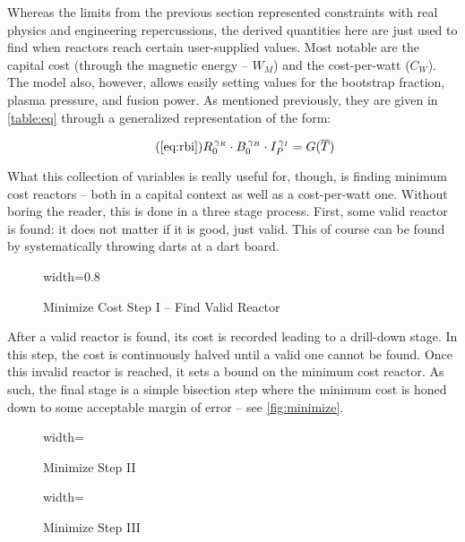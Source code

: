 Whereas the limits from the previous section represented constraints with real physics and engineering repercussions, the derived quantities here are just used to find when reactors reach certain user-supplied values. Most notable are the capital cost (through the magnetic energy -- $W_M$) and the cost-per-watt ($C_W$). The model also, however, allows easily setting values for the bootstrap fraction, plasma pressure, and fusion power. As mentioned previously, they are given in \cref{table:eq} through a generalized representation of the form:

\begin{equation}
	\tag{\ref{eq:rbi}}
	R_0^{\, \gamma_R} \cdot B_0^{\, \gamma_B} \cdot I_P^{\, \gamma_I} = G( \overline T )
\end{equation}

What this collection of variables is really useful for, though, is finding minimum cost reactors -- both in a capital context as well as a cost-per-watt one. Without boring the reader, this is done in a three stage process. First, some valid reactor is found: it does not matter if it is good, just valid. This of course can be found by systematically throwing darts at a dart board. 

\begin{figure}[h]
\centering
\begin{adjustbox}{width=0.8\textwidth}
	
\end{adjustbox}
\caption{Minimize Cost Step I -- Find Valid Reactor}
\label{fig:step_one}
\end{figure}

After a valid reactor is found, its cost is recorded leading to a drill-down stage. In this step, the cost is continuously halved until a valid one cannot be found. Once this invalid reactor is reached, it sets a bound on the minimum cost reactor. As such, the final stage is a simple bisection step where the minimum cost is honed down to some acceptable margin of error -- see \cref{fig:minimize}.

\begin{figure*}
    \centering
    \begin{subfigure}[t]{0.8\textwidth}
        \centering
		\begin{adjustbox}{width=\textwidth}
			
		\end{adjustbox}
        \caption{ Minimize Step II }
    \end{subfigure} 
    \par \bigskip \par \bigskip 
    \begin{subfigure}[t]{0.8\textwidth}
        \centering
		\begin{adjustbox}{width=\textwidth}
			
		\end{adjustbox}
        \caption{ Minimize Step III }
    \end{subfigure}
    \par \bigskip \par \bigskip    
    \caption{Minimize Cost Step II/III -- Optimize Reactor}
    \label{fig:minimize} 
\end{figure*}

